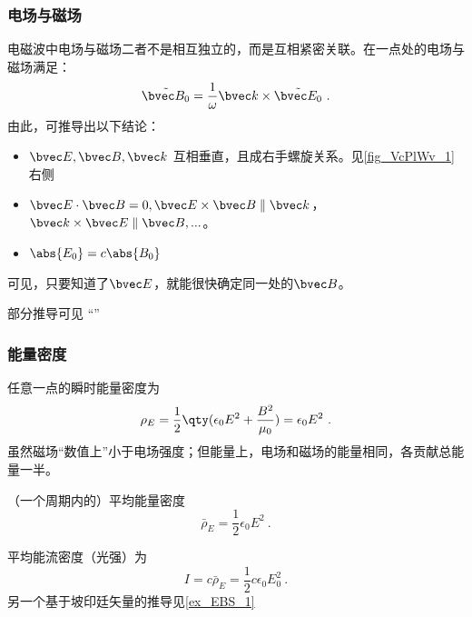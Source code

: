 \subsubsection{电场与磁场}
电磁波中电场与磁场二者不是相互独立的，而是互相紧密关联。在一点处的电场与磁场满足：
\begin{equation}
\tilde {\bvec B_0} = \frac{1}{\omega} \bvec k \times \tilde {\bvec E_0} ~.
\end{equation}
由此，可推导出以下结论：
\begin{itemize}
\item $\bvec E, \bvec B, \bvec k$ 互相垂直，且成右手螺旋关系。见\autoref{fig_VcPlWv_1} 右侧
\item $\bvec E \cdot \bvec B = 0,\bvec E \times \bvec B \parallel \bvec k$，$\bvec k \times \bvec E \parallel \bvec B, ...$。
\item $\abs{E_0}=c\abs{B_0}$
\end{itemize}
可见，只要知道了$\bvec E$，就能很快确定同一处的$\bvec B$。

部分推导可见 “”

\subsubsection{能量密度}
任意一点的瞬时能量密度为
\begin{equation}\label{eq_VcPlWv_2}
\rho_E = \frac{1}{2}\qty(\epsilon_0 E^2 + \frac{B^2}{\mu_0}) = \epsilon_0 E^2~.
\end{equation}
虽然磁场“数值上”小于电场强度；但能量上，电场和磁场的能量相同，各贡献总能量一半。 

（一个周期内的）平均能量密度
\begin{equation}
\bar \rho_E = \frac{1}{2} \epsilon_0 E^2~.
\end{equation}

平均能流密度（光强）为
\begin{equation}
I = c \bar \rho_E = \frac12 c\epsilon_0 E_0^2~.
\end{equation}
另一个基于坡印廷矢量的推导见\autoref{ex_EBS_1}~%


